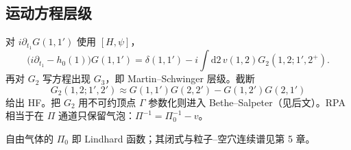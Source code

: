 \subsection{运动方程层级}

对 $i\partial_{t_1}G(1,1')$ 使用 $[H,\psi]$，
\begin{equation}
  \bigl(i\partial_{t_1}-h_0(1)\bigr)G(1,1')
  =\delta(1,1')
  -i\int\mathrm{d}2\,v(1,2)G_2(1,2;1',2^+).
\end{equation}
再对 $G_2$ 写方程出现 $G_3$，即 Martin--Schwinger 层级。截断
\begin{equation}
  G_2(1,2;1',2')
  \approx
  G(1,1')G(2,2')
  -G(1,2')G(2,1')
\end{equation}
给出 HF。把 $G_2$ 用不可约顶点 $\Gamma$ 参数化则进入 Bethe--Salpeter（见后文）。RPA 相当于在 $\Pi$ 通道只保留气泡：$\Pi^{-1}=\Pi_0^{-1}-v$。

\begin{note}
自由气体的 $\Pi_0$ 即 Lindhard 函数；其闭式与粒子--空穴连续谱见第 5 章。
\end{note}
